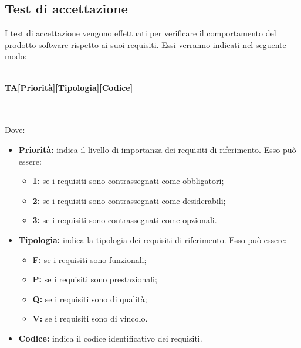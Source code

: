 \subsection{Test di accettazione}
I test di accettazione vengono effettuati per verificare il comportamento del prodotto software rispetto ai suoi requisiti. Essi verranno indicati nel seguente modo:\\\\
\centerline{\textbf{TA[Priorità][Tipologia][Codice]}}\\\\
Dove:
\begin{itemize}
	\item \textbf{Priorità:} indica il livello di importanza dei requisiti di riferimento. Esso può essere:
	\begin{itemize}
		\item \textbf{1:} se i requisiti sono contrassegnati come obbligatori;
		\item \textbf{2:} se i requisiti sono contrassegnati come desiderabili;
		\item \textbf{3:} se i requisiti sono contrassegnati come opzionali.
	\end{itemize}
	\item \textbf{Tipologia:} indica la tipologia dei requisiti di riferimento. Esso può essere:
	\begin{itemize}
		\item \textbf{F:} se i requisiti sono funzionali;
		\item \textbf{P:} se i requisiti sono prestazionali;
		\item \textbf{Q:} se i requisiti sono di qualità;
		\item \textbf{V:} se i requisiti sono di vincolo.
	\end{itemize}
	\item \textbf{Codice:} indica il codice identificativo dei requisiti.
\end{itemize}

